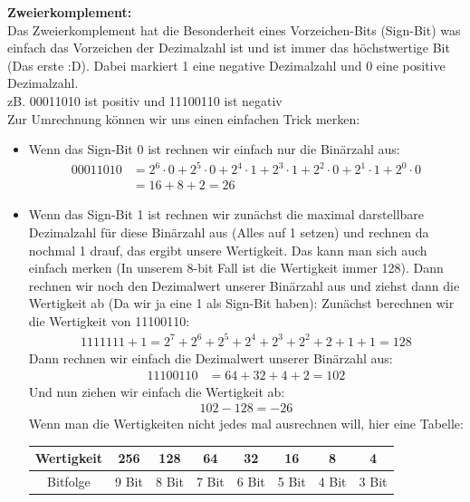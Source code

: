 \documentclass[12pt]{article}
\begin{document}
\begin{flushleft}
    \vspace{1cm}
    \textbf{Zweierkomplement:} \\
    Das Zweierkomplement hat die Besonderheit eines Vorzeichen-Bits (Sign-Bit) was einfach das Vorzeichen der Dezimalzahl ist und ist immer das höchstwertige Bit (Das erste :D).
    Dabei markiert 1 eine negative Dezimalzahl und 0 eine positive Dezimalzahl. \\
    zB. 00011010 ist positiv und 11100110 ist negativ \\
    \vspace{0.5cm}
    Zur Umrechnung können wir uns einen einfachen Trick merken:
    \begin{itemize}
        \item Wenn das Sign-Bit 0 ist rechnen wir einfach nur die Binärzahl aus:
        \begin{align*}
            00011010 &= 2^6 \cdot 0 + 2^5 \cdot 0 + 2^4 \cdot 1 + 2^3 \cdot 1 + 2^2 \cdot 0 + 2^1 \cdot 1 + 2^0 \cdot 0 \\
            &= 16 + 8 + 2 = 26
        \end{align*}
        \item Wenn das Sign-Bit 1 ist rechnen wir zunächst die maximal darstellbare Dezimalzahl für diese Binärzahl aus (Alles auf 1 setzen)
        und rechnen da nochmal 1 drauf, das ergibt unsere Wertigkeit.
        Das kann man sich auch einfach merken (In unserem 8-bit Fall ist die Wertigkeit immer 128).
        Dann rechnen wir noch den Dezimalwert unserer Binärzahl aus und ziehst dann die Wertigkeit ab (Da wir ja eine 1 als Sign-Bit haben): \linebreak
        \linebreak Zunächst berechnen wir die Wertigkeit von 11100110:
        \begin{align*}
            1111111 + 1 = 2^7 + 2^6 + 2^5 + 2^4 + 2^3 + 2^2 + 2 + 1 + 1 = 128
        \end{align*}
        Dann rechnen wir einfach die Dezimalwert unserer Binärzahl aus:
        \begin{align*}
            11100110 &= 64 + 32 + 4 + 2 = 102
        \end{align*}
        Und nun ziehen wir einfach die Wertigkeit ab:
        \begin{align*}
            102 - 128 = -26
        \end{align*}
        Wenn man die Wertigkeiten nicht jedes mal ausrechnen will,
        hier eine Tabelle: \linebreak \linebreak
        \begin{tabular}{|c|c|c|c|c|c|c|c|}
            \hline
            Wertigkeit & 256 & 128 & 64 & 32 & 16 & 8 & 4 \\
            \hline
            Bitfolge & 9 Bit & 8 Bit & 7 Bit & 6 Bit & 5 Bit  & 4 Bit & 3 Bit \\
            \hline
        \end{tabular}
    \end{itemize}
\end{flushleft}
\end{document}
